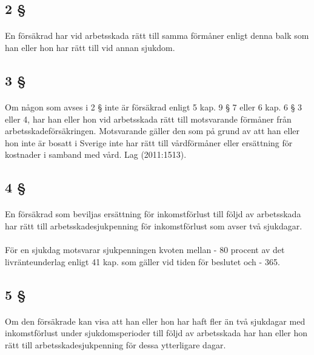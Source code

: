 \documentclass[a4paper,notitlepage,openany,10pt]{book}
\begin{document}
\subsection*{2 §}
\paragraph*{}
En försäkrad har vid arbetsskada rätt till samma förmåner enligt denna balk som han eller hon har rätt till vid annan sjukdom.
\subsection*{3 §}
\paragraph*{}
Om någon som avses i 2 § inte är försäkrad enligt 5 kap. 9 § 7 eller 6 kap. 6 § 3 eller 4, har han eller hon vid arbetsskada rätt till motsvarande förmåner från arbetsskadeförsäkringen. Motsvarande gäller den som på grund av att han eller hon inte är bosatt i Sverige inte har rätt till vårdförmåner eller ersättning för kostnader i samband med vård.
Lag (2011:1513).
\subsection*{4 §}
\paragraph*{}
En försäkrad som beviljas ersättning för inkomstförlust till följd av arbetsskada har rätt till arbetsskadesjukpenning för inkomstförlust som avser två sjukdagar.
\paragraph*{}
För en sjukdag motsvarar sjukpenningen kvoten mellan
\newline - 80 procent av det livränteunderlag enligt 41 kap. som gäller vid tiden för beslutet och
\newline - 365.
\subsection*{5 §}
\paragraph*{}
Om den försäkrade kan visa att han eller hon har haft fler än två sjukdagar med inkomstförlust under sjukdomsperioder till följd av arbetsskada har han eller hon rätt till arbetsskadesjukpenning för dessa ytterligare dagar.
\end{document}
